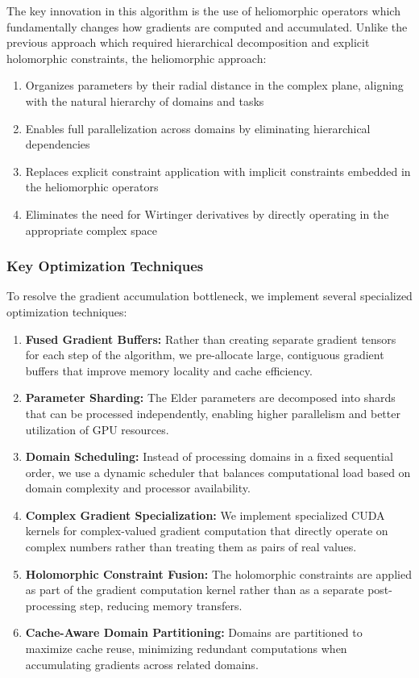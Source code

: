 The key innovation in this algorithm is the use of heliomorphic operators which fundamentally changes how gradients are computed and accumulated. Unlike the previous approach which required hierarchical decomposition and explicit holomorphic constraints, the heliomorphic approach:

\begin{enumerate}
    \item Organizes parameters by their radial distance in the complex plane, aligning with the natural hierarchy of domains and tasks
    \item Enables full parallelization across domains by eliminating hierarchical dependencies
    \item Replaces explicit constraint application with implicit constraints embedded in the heliomorphic operators
    \item Eliminates the need for Wirtinger derivatives by directly operating in the appropriate complex space
\end{enumerate}

\subsubsection{Key Optimization Techniques}

To resolve the gradient accumulation bottleneck, we implement several specialized optimization techniques:

\begin{enumerate}
    \item \textbf{Fused Gradient Buffers:} Rather than creating separate gradient tensors for each step of the algorithm, we pre-allocate large, contiguous gradient buffers that improve memory locality and cache efficiency.
    
    \item \textbf{Parameter Sharding:} The Elder parameters are decomposed into shards that can be processed independently, enabling higher parallelism and better utilization of GPU resources.
    
    \item \textbf{Domain Scheduling:} Instead of processing domains in a fixed sequential order, we use a dynamic scheduler that balances computational load based on domain complexity and processor availability.
    
    \item \textbf{Complex Gradient Specialization:} We implement specialized CUDA kernels for complex-valued gradient computation that directly operate on complex numbers rather than treating them as pairs of real values.
    
    \item \textbf{Holomorphic Constraint Fusion:} The holomorphic constraints are applied as part of the gradient computation kernel rather than as a separate post-processing step, reducing memory transfers.
    
    \item \textbf{Cache-Aware Domain Partitioning:} Domains are partitioned to maximize cache reuse, minimizing redundant computations when accumulating gradients across related domains.
\end{enumerate}

